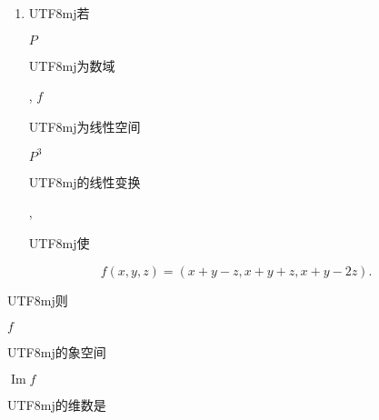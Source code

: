 \documentclass[10pt]{article}
\begin{document}
\begin{enumerate}
  \item \begin{CJK}{UTF8}{mj}若\end{CJK} $P$ \begin{CJK}{UTF8}{mj}为数域\end{CJK}, $f$ \begin{CJK}{UTF8}{mj}为线性空间\end{CJK} $P^{3}$ \begin{CJK}{UTF8}{mj}的线性变换\end{CJK}, \begin{CJK}{UTF8}{mj}使\end{CJK}

\end{enumerate}
$$
f(x, y, z)=(x+y-z, x+y+z, x+y-2 z) .
$$
\begin{CJK}{UTF8}{mj}则\end{CJK} $f$ \begin{CJK}{UTF8}{mj}的象空间\end{CJK} $\operatorname{Im} f$ \begin{CJK}{UTF8}{mj}的维数是\end{CJK}
\end{document}
